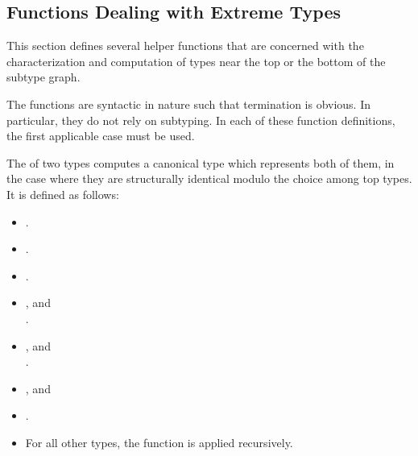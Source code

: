 \documentclass[makeidx]{article}
\begin{document}
{\subsection{Functions Dealing with Extreme Types}

\LMHash{}%
This section defines several helper functions that are concerned with
the characterization and computation of types near the top or the bottom
of the subtype graph.

\LMHash{}%
The functions are syntactic in nature such that termination is obvious.
In particular, they do not rely on subtyping.
In each of these function definitions,
the first applicable case must be used.

\LMHash{}%
The \Index{\TopMergeTypeName} of two types computes
a canonical type which represents both of them,
in the case where they are structurally identical
modulo the choice among top types.
It is defined as follows:

\begin{itemize}
\item {}.
\item \DefEquals{\TopMergeType{\DYNAMIC}{\DYNAMIC}}{\code{\DYNAMIC}}.
\item \DefEquals{\TopMergeType{\VOID}{\VOID}}{\code{\VOID}}.
\item {}, and\\
  .
\item {}, and\\
  .
\item {}, and\\
\item {}.
\item For all other types, the function is applied recursively.

\end{itemize}

}
\end{document}
